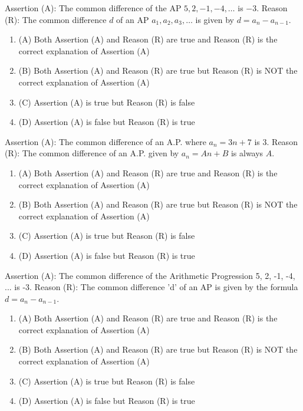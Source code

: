 \documentclass[12pt,a4paper]{exam}
\begin{document}
\begin{questions}
\question[1] Assertion (A): The common difference of the AP $5, 2, -1, -4, \dots$ is $-3$. Reason (R): The common difference $d$ of an AP $a_1, a_2, a_3, \dots$ is given by $d = a_{n} - a_{n-1}$.
\begin{enumerate}[label=(\Alph*)]
  \item (A) Both Assertion (A) and Reason (R) are true and Reason (R) is the correct explanation of Assertion (A)
  \item (B) Both Assertion (A) and Reason (R) are true but Reason (R) is NOT the correct explanation of Assertion (A)
  \item (C) Assertion (A) is true but Reason (R) is false
  \item (D) Assertion (A) is false but Reason (R) is true
\end{enumerate}
\vspace{0.15cm}

\question[1] Assertion (A): The common difference of an A.P. where $a_n = 3n + 7$ is 3. Reason (R): The common difference of an A.P. given by $a_n = An + B$ is always $A$.
\begin{enumerate}[label=(\Alph*)]
  \item (A) Both Assertion (A) and Reason (R) are true and Reason (R) is the correct explanation of Assertion (A)
  \item (B) Both Assertion (A) and Reason (R) are true but Reason (R) is NOT the correct explanation of Assertion (A)
  \item (C) Assertion (A) is true but Reason (R) is false
  \item (D) Assertion (A) is false but Reason (R) is true
\end{enumerate}
\vspace{0.15cm}

\question[1] Assertion (A): The common difference of the Arithmetic Progression 5, 2, -1, -4, ... is -3. Reason (R): The common difference 'd' of an AP is given by the formula $d = a_{n} - a_{n-1}$.
\begin{enumerate}[label=(\Alph*)]
  \item (A) Both Assertion (A) and Reason (R) are true and Reason (R) is the correct explanation of Assertion (A)
  \item (B) Both Assertion (A) and Reason (R) are true but Reason (R) is NOT the correct explanation of Assertion (A)
  \item (C) Assertion (A) is true but Reason (R) is false
  \item (D) Assertion (A) is false but Reason (R) is true
\end{enumerate}
\vspace{0.15cm}


\end{questions}
\end{document}
